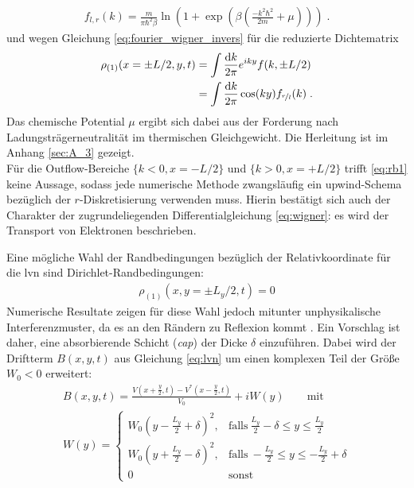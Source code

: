 \begin{align}
  f_{l,r} (k) = \frac{m}{\pi\hbar^2\beta} \ln(1+\exp(\beta(\frac{- k^2\hbar^2}{2m} + \mu))) \; .
  \label{eq:rb2}
\end{align}
und wegen Gleichung \eqref{eq:fourier_wigner_invers} für die reduzierte Dichtematrix
\begin{equation}
  \begin{aligned}
    \rho_{(1)}(x=\pm L/2, y, t) &= \int \frac{\mathop{}\!\mathrm{d} k}{2\pi} e^{iky} f(k,\pm L/2) \\
                                &= \int \frac{\mathop{}\!\mathrm{d} k}{2\pi} \cos(ky) f_{\nicefrac{r}{l}} (k) \; .
  \end{aligned}
  \label{eq:rb4}
\end{equation}
Das chemische Potential $\mu$ ergibt sich dabei aus der Forderung nach Ladungsträgerneutralität im thermischen Gleichgewicht. Die Herleitung ist im Anhang \ref{sec:A_3} gezeigt.\\
Für die Outflow-Bereiche $\{ k<0, x=-L/2 \}$ und $\{ k>0, x=+L/2 \}$ trifft \eqref{eq:rb1} keine Aussage, sodass jede numerische Methode zwangsläufig ein upwind-Schema bezüglich der $r$-Diskretisierung verwenden muss. Hierin bestätigt sich auch der Charakter der zugrundeliegenden Differentialgleichung \eqref{eq:wigner}: es wird der Transport von Elektronen beschrieben.

Eine mögliche Wahl der Randbedingungen bezüglich der Relativkoordinate für die \ac{lvn} sind Dirichlet-Randbedingungen:
\begin{equation}
  \begin{aligned}
    \rho_{(1)}(x, y=\pm L_y/2, t) = 0
  \end{aligned}
  \label{eq:rb3}
\end{equation}
Numerische Resultate zeigen für diese Wahl jedoch mitunter unphysikalische Interferenzmuster, da es an den Rändern zu Reflexion kommt \cite{lukas1}. Ein Vorschlag ist daher, eine absorbierende Schicht (\emph{\ac{cap}}) der Dicke $\delta$ einzuführen. Dabei wird der Driftterm $B(x,y,t)$ aus Gleichung \eqref{eq:lvn} um einen komplexen Teil der Größe $W_0<0$ erweitert:
\begin{equation}
  \begin{aligned}
    B(x,y,t) = \frac{V\left(x+\frac{y}{2},t\right) - V^*\left(x-\frac{y}{2},t\right)}{V_0} + iW(y) \qquad \text{mit} \\
  W(y)=
  \begin{cases}
  W_0 \left(y-\frac{L_y}{2}+\delta \right)^2, & \text{falls}~\frac{L_y}{2}-\delta \le y \le \frac{L_y}{2}\\
  W_0 \left(y+\frac{L_y}{2}-\delta \right)^2, & \text{falls}~-\frac{L_y}{2} \le y \le -\frac{L_y}{2}+\delta\\
  0 & \text{sonst}
  \end{cases}
  \end{aligned}
  \label{eq:cap}
\end{equation}

